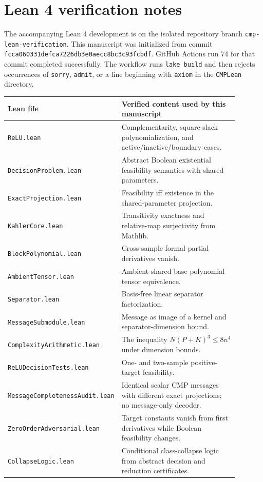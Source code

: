\section{Lean 4 verification notes}
\label{app:lean}

The accompanying Lean 4 development is on the isolated repository branch
\texttt{cmp-lean-verification}.  This manuscript was initialized from commit
\texttt{fcca060331defca7226db3e0aecc8bc3c93fcbdf}.  GitHub Actions run 74 for
that commit completed successfully.  The workflow runs \texttt{lake build} and
then rejects occurrences of \texttt{sorry}, \texttt{admit}, or a line beginning
with \texttt{axiom} in the \texttt{CMPLean} directory.

\begin{center}
\small
\begin{tabular}{>{\raggedright\arraybackslash}p{0.31\linewidth}p{0.58\linewidth}}
\toprule
Lean file & Verified content used by this manuscript\\
\midrule
\texttt{ReLU.lean} & Complementarity, square-slack polynomialization, and active/inactive/boundary cases.\\
\texttt{DecisionProblem.lean} & Abstract Boolean existential feasibility semantics with shared parameters.\\
\texttt{ExactProjection.lean} & Feasibility iff existence in the shared-parameter projection.\\
\texttt{KahlerCore.lean} & Transitivity exactness and relative-map surjectivity from Mathlib.\\
\texttt{BlockPolynomial.lean} & Cross-sample formal partial derivatives vanish.\\
\texttt{AmbientTensor.lean} & Ambient shared-base polynomial tensor equivalence.\\
\texttt{Separator.lean} & Basis-free linear separator factorization.\\
\texttt{MessageSubmodule.lean} & Message as image of a kernel and separator-dimension bound.\\
\texttt{ComplexityArithmetic.lean} & The inequality \(N(P+K)^3\le8n^4\) under dimension bounds.\\
\texttt{ReLUDecisionTests.lean} & One- and two-sample positive-target feasibility.\\
\texttt{MessageCompleteness}\newline\texttt{Audit.lean} & Identical scalar CMP messages with different exact projections; no message-only decoder.\\
\texttt{ZeroOrderAdversarial.lean} & Target constants vanish from first derivatives while Boolean feasibility changes.\\
\texttt{CollapseLogic.lean} & Conditional class-collapse logic from abstract decision and reduction certificates.\\
\bottomrule
\end{tabular}
\end{center}

